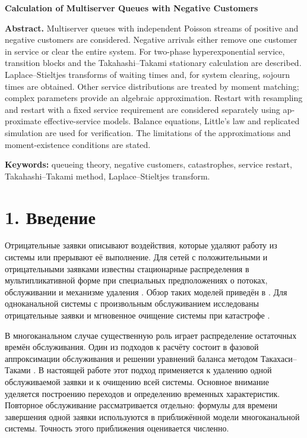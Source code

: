 \begin{otherlanguage}{english}
\bigskip
\begin{center}\textbf{Calculation of Multiserver Queues with Negative Customers}\end{center}
\textbf{Abstract.} Multiserver queues with independent Poisson streams of positive and negative customers are considered. Negative arrivals either remove one customer in service or clear the entire system. For two-phase hyperexponential service, transition blocks and the Takahashi--Takami stationary calculation are described. Laplace--Stieltjes transforms of waiting times and, for system clearing, sojourn times are obtained. Other service distributions are treated by moment matching; complex parameters provide an algebraic approximation. Restart with resampling and restart with a fixed service requirement are considered separately using approximate effective-service models. Balance equations, Little's law and replicated simulation are used for verification. The limitations of the approximations and moment-existence conditions are stated.

\textbf{Keywords:} queueing theory, negative customers, catastrophes, service restart, Takahashi--Takami method, Laplace--Stieltjes transform.
\end{otherlanguage}


\section*{1. Введение}
Отрицательные заявки описывают воздействия, которые удаляют работу из системы или прерывают её выполнение. Для сетей с положительными и отрицательными заявками известны стационарные распределения в мультипликативной форме при специальных предположениях о потоках, обслуживании и механизме удаления \cite{gelenbe1991,gelenbe1992}. Обзор таких моделей приведён в \cite{artalejo2000}. Для одноканальной системы с произвольным обслуживанием исследованы отрицательные заявки \cite{harrison1996} и мгновенное очищение системы при катастрофе \cite{jain1996}.

В многоканальном случае существенную роль играет распределение остаточных времён обслуживания. Один из подходов к расчёту состоит в фазовой аппроксимации обслуживания и решении уравнений баланса методом Такахаси--Таками \cite{takahashi1976,ryzhikov2018ru}. В настоящей работе этот подход применяется к удалению одной обслуживаемой заявки и к очищению всей системы. Основное внимание уделяется построению переходов и определению временных характеристик. Повторное обслуживание рассматривается отдельно: формулы для времени завершения одной заявки используются в приближённой модели многоканальной системы. Точность этого приближения оценивается численно.

